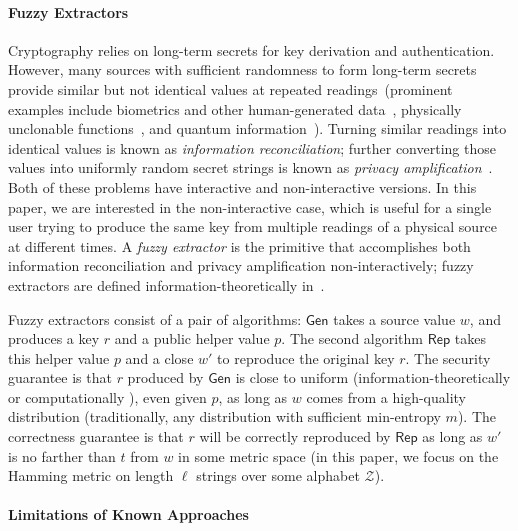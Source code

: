 \documentclass[11pt]{article}
\newcommand{\class}[1]{{\ensuremath{\mathsf{#1}}}}
\newcommand{\gen}{\ensuremath{\class{Gen}}\xspace}
\newcommand{\rep}{\ensuremath{\class{Rep}}\xspace}
\begin{document}
\paragraph{Fuzzy Extractors}
Cryptography relies on long-term secrets for key derivation and authentication. However, many sources with sufficient randomness to form long-term secrets provide similar but not identical values at repeated readings~(prominent examples include biometrics and other human-generated data~\cite{daugman2004,zviran1993comparison,brostoff2000passfaces,ellison2000protecting,mayrhofer2009shake,monrose2002password},
physically unclonable functions~\cite{pappu2002physical,tuyls2006puf,gassend2002silicon,suh2007physical},
and quantum information~\cite{bennett1988privacy}). Turning similar readings into identical values is known as \emph{information reconciliation}; further converting those values into uniformly random secret strings is known as \emph{privacy amplification}~\cite{bennett1988privacy}.
Both of these problems have interactive and non-interactive versions.  In this paper, we are interested in the non-interactive case, which is useful for a single user trying to produce the same key from multiple readings of a physical source at different times.
 A \emph{fuzzy extractor} is the primitive that accomplishes both information reconciliation and privacy amplification non-interactively; fuzzy extractors are defined information-theoretically in~\cite{DBLP:journals/siamcomp/DodisORS08}.


Fuzzy extractors consist of a pair of algorithms: \gen takes a source value $w$, and produces a key $r$ and a public helper value $p$.  The second algorithm \rep takes this helper value $p$ and a close $w'$ to reproduce the original key $r$.  The security guarantee is that $r$ produced by \gen is close to uniform (information-theoretically \cite{DBLP:journals/siamcomp/DodisORS08} or computationally \cite{fuller2013computational}), even given $p$, as long as $w$ comes from a high-quality distribution (traditionally, any distribution with sufficient min-entropy $m$). The correctness guarantee is that $r$ will be correctly reproduced by \rep as long as $w'$ is no farther than $t$ from $w$ in some metric space (in this paper, we focus on the Hamming metric on length $\ell$ strings over some alphabet $\mathcal{Z}$).

\paragraph{Limitations of Known Approaches}
\end{document}
